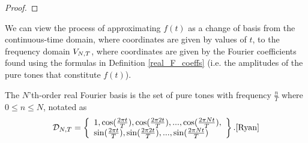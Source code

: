 \begin{theorem}
\begin{proof}
    \end{proof}
    \label{thm:real_F_lin_indep}
\end{theorem}

\par We can view the process of approximating $f(t)$ as a change of basis from the continuous-time domain, where coordinates are given by values of $t$, to the frequency domain $V_{N,T}$, where coordinates are given by the Fourier coefficients found using the formulas in Definition \ref{real_F_coeffs} (i.e. the amplitudes of the pure tones that constitute $f(t)$).

\begin{definition}{The $N$'th-order real Fourier basis is the set of pure tones with frequency $\frac{n}{T}$ where $0\le n \le N$, notated as}
   \[\mathcal{D}_{N,T} = \left\{\begin{array}{ll}
   1,\cos(\frac{2\pi t}{T}), \cos(\frac{2\pi 2t}{T}), ..., \cos(\frac{2\pi Nt}{T}), \\
   \sin(\frac{2\pi t}{T}), \sin(\frac{2\pi 2t}{T}), ..., \sin(\frac{2\pi Nt}{T})
   \end{array}\right\}.\cite{Ryan}
   \]
\end{definition}